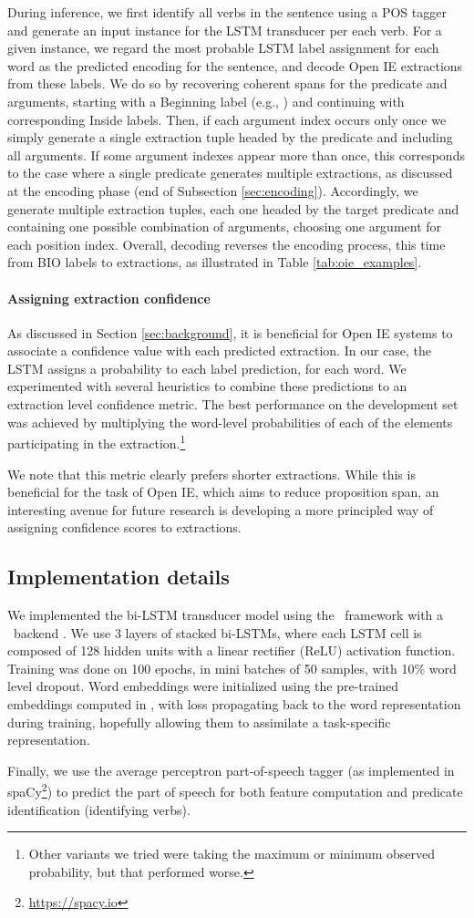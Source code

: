 During inference, we first identify all verbs in the sentence using a POS tagger and generate an input instance for the LSTM transducer per each verb.
For a given instance, we regard the most probable LSTM label assignment for each word as the predicted encoding for the sentence, and decode Open IE extractions from these labels.
We do so by recovering coherent spans for the predicate and arguments, starting with a Beginning label (e.g., ) and continuing with corresponding Inside labels.
Then, if each argument index occurs only once we simply generate a single extraction tuple headed by the predicate and including all arguments. If some argument indexes appear more than once, this corresponds to the case where a single predicate generates multiple extractions, as discussed at the encoding phase (end of Subsection \ref{sec:encoding}). Accordingly, we generate multiple extraction tuples, each one headed by the target predicate and containing one possible combination of arguments, choosing one argument for each position index. Overall, decoding reverses the encoding process, this time from BIO labels to extractions, as illustrated in Table \ref{tab:oie_examples}.


\paragraph{Assigning extraction confidence}
As discussed in Section \ref{sec:background}, it is beneficial for Open IE systems to associate a confidence value with each predicted extraction.
In our case, the LSTM assigns a probability to each label prediction, for each word.
We experimented with several heuristics to combine these predictions to an extraction level confidence metric.
The best performance on the development set was achieved by multiplying the word-level probabilities of each
of the elements participating in the extraction.\footnote{Other variants we tried were taking the maximum or
minimum observed probability, but that performed worse.}

We note that this metric clearly prefers shorter extractions.
While this is beneficial for the task of Open IE, which aims to reduce proposition span, an interesting
avenue for future research is developing a more principled way of assigning confidence scores to extractions.


\subsection{Implementation details}
We implemented the bi-LSTM transducer model using the \keras\ framework \cite{chollet2015} with a \tensorflow\ backend \cite{tensorflow2015-whitepaper}.
We use 3 layers of stacked bi-LSTMs, where each LSTM cell is composed of 128 hidden units
with a linear rectifier (ReLU) \cite{nair2010rectified} activation function.
Training was done on 100 epochs, in mini batches of 50 samples, with 10\% word level
dropout.
Word embeddings were initialized using the pre-trained embeddings computed in , with loss propagating back to the word representation during training, hopefully
allowing them to assimilate a task-specific representation.

Finally, we use the average perceptron part-of-speech tagger (as implemented in spaCy\footnote{\url{https://spacy.io}})
to predict the part of speech for both feature computation and predicate identification (identifying verbs).
